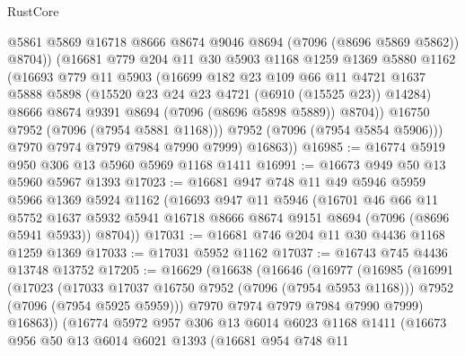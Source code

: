 \begin{lexlean}{RustCore}
\begin{coremodule}
                @5861
                @5869
                @16718
                @8666
                @8674
                @9046
                @8694
                (@7096 (@8696 @5869 @5862))
                @8704))
            (@16681
              @779
              @204
              @11
              @30
              @5903
              @1168
              @1259
              @1369
              @5880
              @1162
              (@16693
                @779
                @11
                @5903
                (@16699
                  @182
                  @23
                  @109
                  @66
                  @11
                  @4721
                  @1637
                  @5888
                  @5898
                  (@15520 @23 @24 @23 @4721 (@6910 (@15525 @23)) @14284)
                  @8666
                  @8674
                  @9391
                  @8694
                  (@7096 (@8696 @5898 @5889))
                  @8704))
              @16750
              @7952
              (@7096 (@7954 @5881 @1168)))
            @7952
            (@7096 (@7954 @5854 @5906)))
          @7970
          @7974
          @7979
          @7984
          @7990
          @7999)
        @16863))
@16985 := @16774 @5919 @950 @306 @13 @5960 @5969 @1168 @1411
@16991 := @16673 @949 @50 @13 @5960 @5967 @1393
@17023 := @16681
    @947
    @748
    @11
    @49
    @5946
    @5959
    @5966
    @1369
    @5924
    @1162
    (@16693
      @947
      @11
      @5946
      (@16701
        @46
        @66
        @11
        @5752
        @1637
        @5932
        @5941
        @16718
        @8666
        @8674
        @9151
        @8694
        (@7096 (@8696 @5941 @5933))
        @8704))
@17031 := @16681 @746 @204 @11 @30 @4436 @1168 @1259 @1369
@17033 := @17031 @5952 @1162
@17037 := @16743 @745 @4436 @13748 @13752
@17205 := @16629
    (@16638
      (@16646
        (@16977
          (@16985
            (@16991
              (@17023
                (@17033 @17037 @16750 @7952 (@7096 (@7954 @5953 @1168)))
                @7952
                (@7096 (@7954 @5925 @5959)))
              @7970
              @7974
              @7979
              @7984
              @7990
              @7999)
            @16863))
        (@16774
          @5972
          @957
          @306
          @13
          @6014
          @6023
          @1168
          @1411
          (@16673
            @956
            @50
            @13
            @6014
            @6021
            @1393
            (@16681
              @954
              @748
              @11

\end{coremodule}
\end{lexlean}
